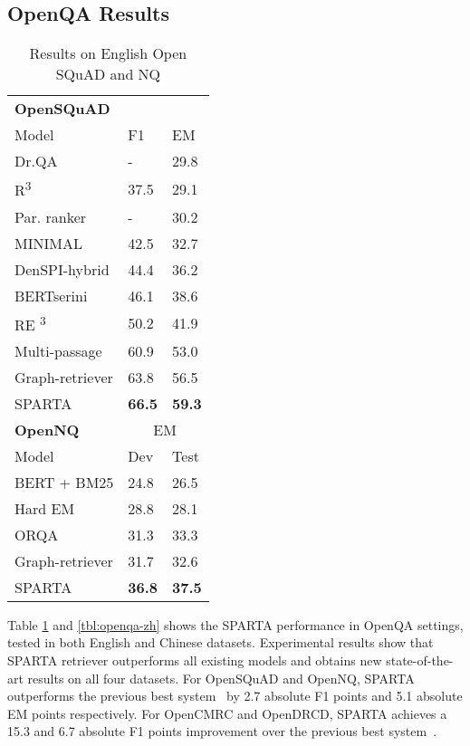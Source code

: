 \documentclass[11pt,a4paper]{article}
\begin{document}
 \subsection{OpenQA Results}
\begin{table}[ht!]
\centering
\begin{tabular}{p{}p{}p{}} 
\hline
\textbf{OpenSQuAD} &  &  \\ 
Model & F1 & EM \\ \hline
Dr.QA\cite{chen2017reading}  & - & 29.8  \\ 
R\textsuperscript{3} \cite{wang2018r} & 37.5 & 29.1 \\
Par. ranker \cite{lee2018ranking} & - & 30.2 \\
MINIMAL \cite{min2018efficient} & 42.5 & 32.7 \\
DenSPI-hybrid \cite{seo2019real} & 44.4 & 36.2 \\
BERTserini \cite{yang2019end} & 46.1 & 38.6 \\
RE \textsuperscript{3} \cite{hu2019retrieve} & 50.2 & 41.9 \\
Multi-passage \cite{wang2019multi} & 60.9 & 53.0 \\
Graph-retriever \cite{asai2019learning} & 63.8 & 56.5 \\
\hline
SPARTA & \textbf{66.5} & \textbf{59.3} \\

\Xhline{3\arrayrulewidth}

\textbf{OpenNQ} & \multicolumn{2}{c}{EM} \\ 
Model & Dev & Test \\ \hline
BERT + BM25 \cite{lee2018ranking} & 24.8 & 26.5 \\
Hard EM \cite{min2019discrete} & 28.8 & 28.1\\
ORQA\cite{lee2019latent}  & 31.3 & 33.3  \\
Graph-retriever \cite{asai2019learning} & 31.7 & 32.6 \\
\hline
SPARTA & \textbf{36.8} & \textbf{37.5} \\
\hline

\end{tabular}
\caption{Results on English Open SQuAD and NQ}
\label{tbl:openqa-en}
\end{table}

Table \ref{tbl:openqa-en} and \ref{tbl:openqa-zh} shows the SPARTA performance in OpenQA settings, tested in both English and Chinese datasets. Experimental results show that SPARTA retriever outperforms all existing models and obtains new state-of-the-art results on all four datasets. For OpenSQuAD and OpenNQ, SPARTA outperforms the previous best system~\cite{asai2019learning} by 2.7 absolute F1 points and 5.1 absolute EM points respectively. For OpenCMRC and OpenDRCD, SPARTA achieves a 15.3 and 6.7 absolute F1 points improvement over the previous best system~\cite{xie2020distant}.
\end{document}
